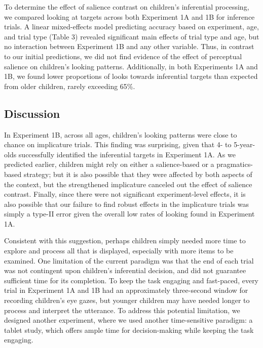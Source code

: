 \documentclass[a4paper,man,apacite,floatsintext]{apa6}
\begin{document}
To determine the effect of salience contrast on children's inferential
processing, we compared looking at targets across both Experiment 1A and
1B for inference trials. A linear mixed-effects model predicting
accuracy based on experiment, age, and trial type (Table 3) revealed
significant main effects of trial type and age, but no interaction
between Experiment 1B and any other variable. Thus, in contrast to our
initial predictions, we did not find evidence of the effect of
perceptual salience on children's looking patterns. Additionally, in
both Experiments 1A and 1B, we found lower proportions of looks towards
inferential targets than expected from older children, rarely exceeding
65\%.

\subsection{Discussion}\label{discussion-1}

In Experiment 1B, across all ages, children's looking patterns were
close to chance on implicature trials. This finding was surprising,
given that 4- to 5-year-olds successfully identified the inferential
targets in Experiment 1A. As we predicted earlier, children might rely
on either a salience-based or a pragmatics-based strategy; but it is
also possible that they were affected by both aspects of the context,
but the strengthened implicature canceled out the effect of salience
contrast. Finally, since there were not significant experiment-level
effects, it is also possible that our failure to find robust effects in
the implicature trials was simply a type-II error given the overall low
rates of looking found in Experiment 1A.

Consistent with this suggestion, perhaps children simply needed more
time to explore and process all that is displayed, especially with more
items to be examined. One limitation of the current paradigm was that
the end of each trial was not contingent upon children's inferential
decision, and did not guarantee sufficient time for its completion. To
keep the task engaging and fast-paced, every trial in Experiment 1A and
1B had an approximately three-second window for recording children's eye
gazes, but younger children may have needed longer to process and
interpret the utterance. To address this potential limitation, we
designed another experiment, where we used another time-sensitive
paradigm: a tablet study, which offers ample time for decision-making
while keeping the task engaging.
\end{document}
